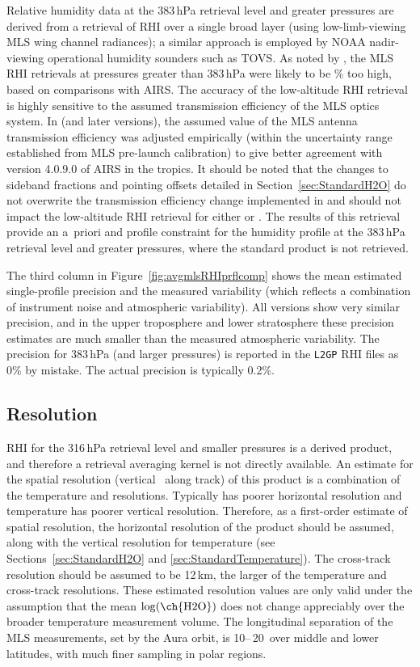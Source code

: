 Relative humidity data at the 383\,hPa retrieval level and greater pressures are derived from a retrieval of RHI over a single broad layer (using low-limb-viewing MLS wing channel radiances); a similar approach is employed by NOAA nadir-viewing operational humidity sounders such as TOVS\@. As noted by \citet{ReadEtal:2007}, the MLS \vii RHI retrievals at pressures greater than 383\,hPa were likely to be \% too high, based on comparisons with AIRS\@. The accuracy of the low-altitude RHI retrieval is highly sensitive to the assumed transmission efficiency of the MLS optics system. In \viii (and later versions), the assumed value of the MLS antenna transmission efficiency was adjusted empirically (within the uncertainty range established from MLS pre-launch calibration) to give better agreement with version 4.0.9.0 of AIRS in the tropics. It should be noted that the changes to sideband fractions and pointing offsets detailed in Section~\ref{sec:StandardH2O} do not overwrite the transmission efficiency change implemented in \viii and should not impact the low-altitude RHI retrieval for either \prevv or \thisv. The results of this retrieval provide an a~priori and profile constraint for the humidity profile at the 383\,hPa retrieval level and greater pressures, where the standard  product is not retrieved.

The third column in Figure~\ref{fig:avgmlsRHIprflcomp} shows the mean estimated single-profile precision and the measured variability (which reflects a combination of instrument noise and atmospheric variability). All versions show very similar precision, and in the upper troposphere and lower stratosphere these precision estimates are much smaller than the measured atmospheric variability. The precision for 383\,hPa (and larger pressures) is reported in the \texttt{L2GP} RHI files as 0\% by mistake. The actual precision is typically 0.2\%.

\subsection{Resolution}

RHI for the 316\,hPa retrieval level and smaller pressures is a derived product, and therefore a retrieval averaging kernel is not directly available. An estimate for the spatial resolution (vertical \texttimes\ along track) of this product is a combination of the temperature and  resolutions. Typically  has poorer horizontal resolution and temperature has poorer vertical resolution. Therefore, as a first-order estimate of spatial resolution, the horizontal resolution of the  product should be assumed, along with the vertical resolution for temperature (see Sections~\ref{sec:StandardH2O} and \ref{sec:StandardTemperature}). The cross-track resolution should be assumed to be 12\,km, the larger of the temperature and  cross-track resolutions. These estimated resolution values are only valid under the assumption that the mean $\log(\text{\ch{H2O}})$ does not change appreciably over the broader temperature measurement volume. The longitudinal separation of the MLS measurements, set by the Aura orbit, is 10\degsym--\,20\degsym\ over middle and lower latitudes, with much finer sampling in polar regions.


